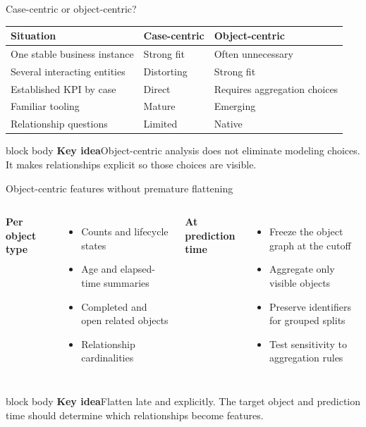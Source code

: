 \documentclass[aspectratio=169,11pt]{beamer}
\newcommand{\keyidea}[1]{%
  \begin{beamercolorbox}[rounded=true,sep=0.65em]{block body}
    \textbf{\color{Teal}Key idea}\quad #1
  \end{beamercolorbox}
}
\begin{document}
\begin{frame}{Case-centric or object-centric?}
  \small
  \begin{tabular}{@{}p{}p{}p{}@{}}
    \toprule
    Situation & Case-centric & Object-centric\\
    \midrule
    One stable business instance & Strong fit & Often unnecessary\\
    Several interacting entities & Distorting & Strong fit\\
    Established KPI by case & Direct & Requires aggregation choices\\
    Familiar tooling & Mature & Emerging\\
    Relationship questions & Limited & Native\\
    \bottomrule
  \end{tabular}
  \vspace{0.5cm}
  \keyidea{Object-centric analysis does not eliminate modeling choices. It makes
  relationships explicit so those choices are visible.}
\end{frame}

\begin{frame}{Object-centric features without premature flattening}
  \begin{columns}[T,onlytextwidth]
      \textbf{Per object type}
      \begin{itemize}
        \item Counts and lifecycle states
        \item Age and elapsed-time summaries
        \item Completed and open related objects
        \item Relationship cardinalities
      \end{itemize}
      \textbf{At prediction time}
      \begin{itemize}
        \item Freeze the object graph at the cutoff
        \item Aggregate only visible objects
        \item Preserve identifiers for grouped splits
        \item Test sensitivity to aggregation rules
      \end{itemize}
  \end{columns}
  \vspace{0.45cm}
  \keyidea{Flatten late and explicitly. The target object and prediction time
  should determine which relationships become features.}
\end{frame}
\end{document}
